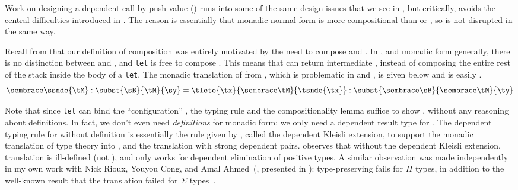 Work on designing a dependent call-by-push-value () runs into
some of the same design issues that we see in 
\cite{ahman2017:dissertation,vakar2017:dissertation}, but critically, avoids the
central difficulties introduced in .
The reason is essentially that monadic normal form is more compositional than
 or , so  is not disrupted in the same way.

Recall from  that our definition of composition was
entirely motivated by the need to compose  and
.
In , and monadic form generally, there is no distinction between
 and , and \texttt{let} is
free to compose .
This means that  can return intermediate
, instead of composing the entire rest of the stack inside
the body of a \texttt{let}.
The monadic translation of \im{\ssnde{\se}} from , which is
problematic in  and , is given below and is easily
.
%
\begin{displaymath}
  \anfh{\ssnde{\se} : \subst{\sB}{\se}{\sy}} = \tlete{\tx}{\anfh{\se}}{\tsnde{\tx}} : \subst{\anfh{\sB}}{\anfh{\se}}{\ty}
\end{displaymath}

Note that since \texttt{let} can bind the ``configuration'' \im{\anfh{\se}}, the
typing rule  and the compositionality lemma suffice to show
, without any reasoning about definitions.
In fact, we don't even need \emph{definitions} for monadic form; we only need a
dependent result type for .
The dependent typing rule for  without definition is essentially
the rule given by \citet{vakar2017:dissertation}, called the dependent Kleisli
extension, to support the  monadic translation of type theory into
, and the  translation with strong dependent pairs.
\citet{vakar2017:dissertation} observes that without the dependent Kleisli
extension,  translation is ill-defined (not ),
and  only works for dependent elimination of positive types.
A similar observation was made independently in my own work with Nick Rioux,
Youyou Cong, and Amal Ahmed~(\citeyear{bowman2018:cps-sigma}, presented in
): type-preserving   fails for \(\Pi\)
types, in addition to the well-known
result that the  translation failed for \(\Sigma\)
types~\cite{barthe2002}.

